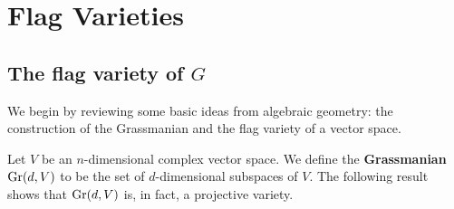 \chapter{Flag Varieties}



\section{The flag variety of $G$}

We begin by reviewing some basic ideas from algebraic geometry: the construction
of the Grassmanian and the flag variety of a vector space.

\begin{definition}
    Let $V$ be an $n$-dimensional complex vector space. We define the \textbf{Grassmanian} $\operatorname{Gr}(d,V)$
    to be the set of $d$-dimensional subspaces of $V$. The following result shows that $\operatorname{Gr}(d,V)$ is,
    in fact, a projective variety.
\end{definition}

